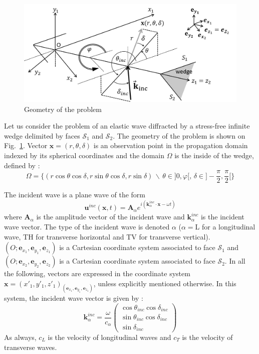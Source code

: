 \begin{figure}[h]
\centering
	\includegraphics[width=\textwidth]{images/chapter4/wedge_3D.png}
\caption{Geometry of the problem}
\label{diedre_coords}
\end{figure}

Let us consider the problem of an elastic wave diffracted by a stress-free infinite wedge delimited by faces $\mathcal{S}_1$ and $\mathcal{S}_2$. The geometry of the problem is shown on Fig.~\ref{diedre_coords}. Vector $\mathbf{x}=(r,\theta,\delta)$ is an observation point in the propagation domain indexed by its spherical coordinates and the domain $\Omega$ is the inside of the wedge, defined by :
\begin{equation}
\Omega=\{ (r\cos \theta \cos \delta, r \sin \theta \cos \delta, r \sin \delta)\, \backslash \, \theta \in \rbrack 0, \varphi \lbrack, \, \delta \in \rbrack -\frac{\pi}{2}, \frac{\pi}{2} \lbrack \}
\end{equation}

The incident wave is a plane wave of the form
\begin{equation}
\mathbf{u}^{inc}(\mathbf{x},t)=\mathbf{A}_{\alpha}e^{i(\mathbf{k}_{\alpha}^{inc}\cdot \mathbf{x}-\omega t)}
\end{equation}
where $\mathbf{A}_{\alpha}$ is the amplitude vector of the incident wave and $\mathbf{k}_{\alpha}^{inc}$ is the incident wave vector. The type of the incident wave is denoted $\alpha$ ($\alpha=$L for a longitudinal wave, TH for transverse horizontal and TV for transverse vertical). $(O; \mathbf{e}_{x_1}, \mathbf{e}_{y_1}, \mathbf{e}_{z_1})$ is a Cartesian coordinate system associated to face $\mathcal{S}_1$ and $(O; \mathbf{e}_{x_2}, \mathbf{e}_{y_2}, \mathbf{e}_{z_2})$ is a Cartesian coordinate system associated to face $\mathcal{S}_2$. In all the following, vectors are expressed in the coordinate system $\mathbf{x}=(x'_1,y'_1,z'_1)_{(\mathbf{e}_{x_1}, \mathbf{e}_{y_1}, \mathbf{e}_{z_1})}$, unless explicitly mentioned otherwise. In this system, the incident wave vector is given by :
\begin{equation}
\mathbf{k}_{\alpha}^{inc}=\frac{\omega}{c_{\alpha}} \begin{pmatrix}
\cos\theta_{inc} \cos \delta_{inc} \\ \sin\theta_{inc} \cos \delta_{inc} \\
\sin \delta_{inc}
\end{pmatrix}
\end{equation}
As always, $c_L$ is the velocity of longitudinal waves and $c_T$ is the velocity of transverse waves.

